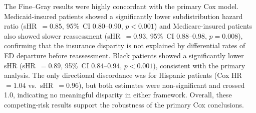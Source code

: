 The Fine--Gray results were highly concordant with the primary Cox model.
Medicaid-insured patients showed a significantly lower subdistribution hazard ratio (sHR~$= 0.85$, 95\%~CI 0.80--0.90, $p<0.001$) and Medicare-insured patients also showed slower reassessment (sHR~$= 0.93$, 95\%~CI 0.88--0.98, $p = 0.008$), confirming that the insurance disparity is not explained by differential rates of ED departure before reassessment.
Black patients showed a significantly lower sHR (sHR~$= 0.89$, 95\%~CI 0.84--0.94, $p<0.001$), consistent with the primary analysis.
The only directional discordance was for Hispanic patients (Cox HR~$= 1.04$ vs.\ sHR~$= 0.96$), but both estimates were non-significant and crossed 1.0, indicating no meaningful disparity in either framework.
Overall, these competing-risk results support the robustness of the primary Cox conclusions.
